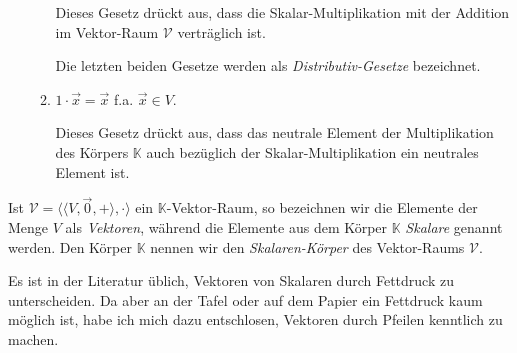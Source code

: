 \begin{Definition}
\begin{enumerate}
\begin{enumerate}
            Dieses Gesetz dr\"{u}ckt aus, dass die Skalar-Multiplikation mit der Addition im Vektor-Raum
            $\mathcal{V}$ vertr\"{a}glich ist.

            Die letzten beiden Gesetze werden als \emph{Distributiv-Gesetze} bezeichnet.
      \item $1 \cdot \vec{x} = \vec{x}$ \quad f.a. $\vec{x} \in V$.  

            Dieses Gesetz dr\"{u}ckt aus, dass das neutrale Element der Multiplikation des K\"{o}rpers
            $\mathbb{K}$ auch bez\"{u}glich der Skalar-Multiplikation ein neutrales Element ist. 
      \end{enumerate}
\end{enumerate} 
Ist $\mathcal{V} = \bigl\langle \langle V, \vec{0}, + \rangle, \cdot \bigr\rangle$  ein $\mathbb{K}$-Vektor-Raum, so bezeichnen wir die Elemente der Menge
$V$ als \emph{Vektoren}, w\"{a}hrend die Elemente aus dem K\"{o}rper $\mathbb{K}$ 
\emph{Skalare} genannt werden.  Den K\"{o}rper $\mathbb{K}$ nennen wir den
\emph{Skalaren-K\"{o}rper} des Vektor-Raums $\mathcal{V}$.  
\eoxs
\end{Definition}

\remark
Es ist in der Literatur \"{u}blich, Vektoren von Skalaren durch Fettdruck zu unterscheiden.  
Da aber an der Tafel oder auf dem Papier ein Fettdruck kaum m\"{o}glich ist, habe ich mich dazu entschlosen, 
Vektoren durch Pfeilen kenntlich zu machen.
\eox


